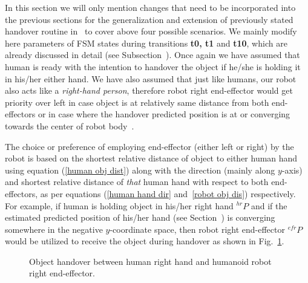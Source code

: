 In this section we will only mention changes that need to be incorporated into the previous sections for the generalization and extension of previously stated handover routine in~ to cover above four possible scenarios. We mainly modify here parameters of FSM states during transitions {\bf t0, t1} and {\bf t10}, which are already discussed in detail (see Subsection~). Once again we have assumed that human is ready with the intention to handover the object if he/she is holding it in his/her either hand. We have also assumed that just like humans, our robot also acts like a \textit{right-hand person}, therefore robot right end-effector would get priority over left in case object is at relatively same distance from both end-effectors or in case where the handover predicted position is at or converging towards the center of robot body~\cite{han2013quantifying}.


The choice or preference of employing end-effector (either left or right) by the robot is based on the shortest relative distance of object to either human hand using equation (\ref{human obj dist}) along with the direction (mainly along $y$-axis) and shortest relative distance of \textit{that} human hand with respect to both end-effectors, as per equations (\ref{human hand dir} and~\ref{robot obj dis}) respectively. For example, if human is holding object in his/her right hand ${}^{hr}{P}$ and if the estimated predicted position of his/her hand (see Section~) is converging somewhere in the negative $y$-coordinate space, then robot right end-effector ${}^{efr}{P}$ would be utilized to receive the object during handover as shown in Fig.~\ref{fig:hr-to-rr}.


\begin{figure}[hpt]
	\caption{Object handover between human right hand and humanoid robot right end-effector.}
	\label{fig:hr-to-rr}
\end{figure}


